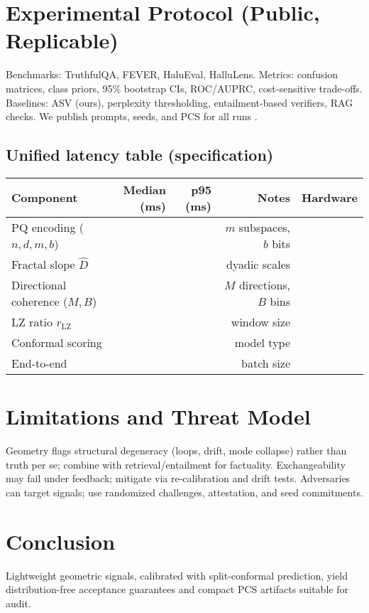 \documentclass[11pt]{article}
\begin{document}
\section{Experimental Protocol (Public, Replicable)}
Benchmarks: TruthfulQA, FEVER, HaluEval, HalluLens. Metrics: confusion matrices, class priors, 95\% bootstrap CIs, ROC/AUPRC, cost-sensitive trade-offs. Baselines: ASV (ours), perplexity thresholding, entailment-based verifiers, RAG checks. We publish prompts, seeds, and PCS for all runs \citep{lin2022truthfulqa,thorne2018fever}.

\subsection*{Unified latency table (specification)}
\begin{center}
\begin{tabular}{lrrrr}
\toprule
Component & Median (ms) & p95 (ms) & Notes & Hardware \\
\midrule
PQ encoding ($n,d,m,b$) & & & $m$ subspaces, $b$ bits & \\
Fractal slope $\hat D$ & & & dyadic scales & \\
Directional coherence ($M,B$) & & & $M$ directions, $B$ bins & \\
LZ ratio $r_{\mathrm{LZ}}$ & & & window size & \\
Conformal scoring & & & model type & \\
\midrule
End-to-end & & & batch size & \\
\bottomrule
\end{tabular}
\end{center}

\section{Limitations and Threat Model}
Geometry flags structural degeneracy (loops, drift, mode collapse) rather than truth per se; combine with retrieval/entailment for factuality. Exchangeability may fail under feedback; mitigate via re-calibration and drift tests. Adversaries can target signals; use randomized challenges, attestation, and seed commitments.

\section{Conclusion}
Lightweight geometric signals, calibrated with split-conformal prediction, yield distribution-free acceptance guarantees and compact PCS artifacts suitable for audit.



\end{document}
